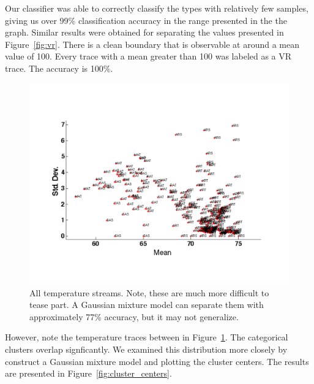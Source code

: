 
Our classifier was able to correctly classify the types with relatively few samples, giving us over 99\% classification accuracy in
the range presented in the the graph.  Similar results were obtained for separating the values presented in Figure~\ref{fig:vr}.
There is a clean boundary that is observable at around a mean value of 100.  Every trace with a mean greater than 100 was labeled as a VR
trace.  The accuracy is 100\%.

\begin{figure}[t!] %
\centering
\includegraphics[width=0.8\columnwidth]{figs/temperature_streams}
\caption{All temperature streams.  Note, these are much more difficult to tease part.  A Gaussian mixture model can
separate them with approximately 77\% accuracy, but it may not generalize.}
\label{fig:temps}
\end{figure}

However, note the temperature traces between in Figure~\ref{fig:temps}.  The categorical clusters overlap signficantly.  We 
examined this distribution more closely by construct a Gaussian mixture model and plotting the cluster centers.  The results
are presented in Figure~\ref{fig:cluster_centers}.


